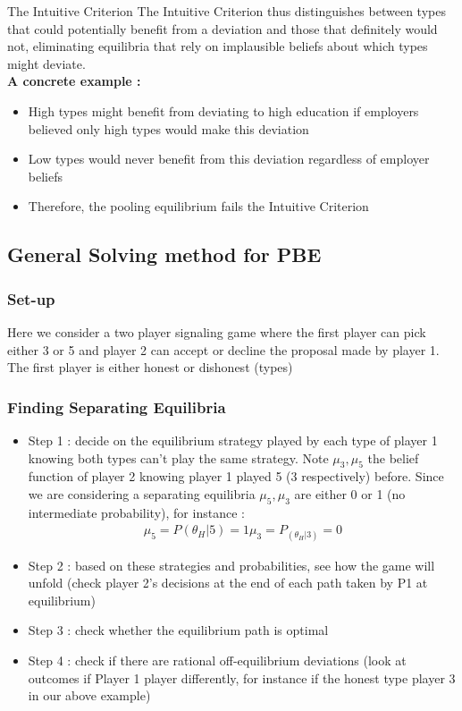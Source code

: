 \documentclass{article}
\begin{document}
\begin{simplebox}{The Intuitive Criterion }
         The Intuitive Criterion thus distinguishes between types that could potentially benefit from a deviation and those that definitely would not, eliminating equilibria that rely on implausible beliefs about which types might deviate.  \\
        \textbf{A concrete example :} 
        \begin{itemize}
            \item High types might benefit from deviating to high education if employers believed only high types would make this deviation
            \item Low types would never benefit from this deviation regardless of employer beliefs
            \item Therefore, the pooling equilibrium fails the Intuitive Criterion
        \end{itemize}
    \end{simplebox}

\subsection{General Solving method for PBE}
\subsubsection{Set-up}
Here we consider a two player signaling game where the first player can pick either 3 or 5 and player 2 can accept or decline the proposal made by player 1. The first player is either honest or dishonest (types)
\subsubsection{Finding Separating Equilibria}
\begin{itemize}
    \item Step 1 : decide on the equilibrium strategy played by each type of player 1 knowing both types can't play the same strategy. Note $\mu_3,\mu_5$ the belief function of player 2 knowing player 1 played 5 (3 respectively) before. Since we are considering a separating equilibria $\mu_5,\mu_3$ are either 0 or 1 (no intermediate probability), for instance : 
    \begin{equation}
    \begin{aligned}
        \mu_5 = P(\theta_H|5) = 1 
        \mu_3 = P_(\theta_H|3) = 0 
    \end{aligned}
    \end{equation}
    \item Step 2 : based on these strategies and probabilities, see how the game will unfold (check player 2's decisions at the end of each path taken by P1 at equilibrium)
    \item Step 3 : check whether the equilibrium path is optimal
    \item Step 4 : check if there are rational off-equilibrium deviations (look at outcomes if Player 1 player differently, for instance if the honest type player 3 in our above example)
\end{itemize}
\end{document}
